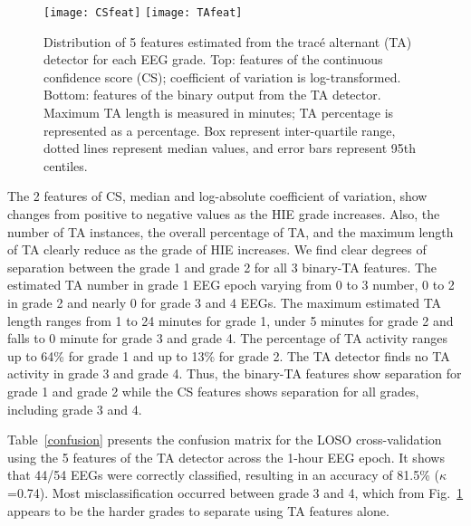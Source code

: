 \documentclass[conference]{IEEEtran}
\begin{document}
\begin{figure}[h!]
\centering
\texttt{[image: CSfeat]}
\texttt{[image: TAfeat]}
\caption{Distribution of 5 features estimated from the trac\'e alternant (TA) detector for each EEG grade. 
Top: features of the continuous confidence score (CS); coefficient of variation is log-transformed.
Bottom: features of the binary output from the TA detector.
Maximum TA length is measured in minutes; TA percentage is represented as a percentage. Box represent inter-quartile range, dotted lines represent median values, and error bars represent 95th centiles.
}
\label{tafeatperf}
\vspace{-0.3cm}
\end{figure}

The 2 features of CS, median and log-absolute coefficient of variation, show changes from positive to negative values as the HIE grade increases. Also, the number of TA instances, the overall percentage of TA, and the maximum length of TA clearly reduce as the grade of HIE increases. We find clear degrees of separation between the grade 1 and grade 2 for all 3 binary-TA features. The estimated TA number in grade 1 EEG epoch varying from 0 to 3 number, 0 to 2 in grade 2 and nearly 0 for grade 3 and 4 EEGs. The maximum estimated TA length ranges from 1 to 24 minutes for grade 1, under 5 minutes for grade 2 and falls to 0 minute for grade 3 and grade 4. The percentage of TA activity ranges up to 64\% for grade 1 and up to 13\% for grade 2. The TA detector finds no TA activity in grade 3 and grade 4. Thus, the binary-TA features show separation for grade 1 and grade 2 while the CS features shows separation for all grades, including grade 3 and 4.

Table~\ref{confusion} presents the confusion matrix for the LOSO cross-validation using the 5 features of the TA detector across the 1-hour EEG epoch. It shows that 44/54 EEGs were correctly classified, resulting in an accuracy of 81.5\% ($\kappa$=0.74). Most misclassification occurred between grade 3 and 4, which from Fig.~\ref{tafeatperf} appears to be the harder grades to separate using TA features alone.
\end{document}
